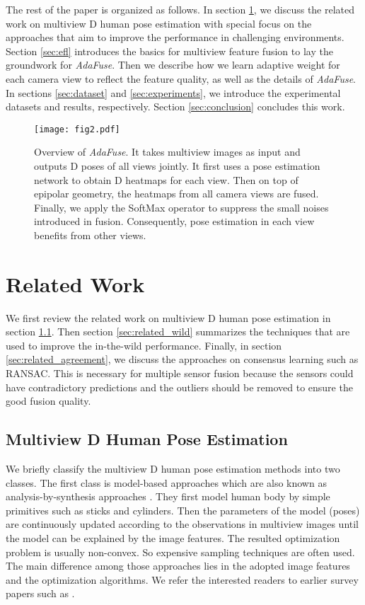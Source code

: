 The rest of the paper is organized as follows. In section \ref{sec:relatedwork}, we discuss the related work on multiview D human pose estimation with special focus on the approaches that aim to improve the performance in challenging environments. Section \ref{sec:efl} introduces the basics for multiview feature fusion to lay the groundwork for \emph{AdaFuse}. Then we describe how we learn adaptive weight for each camera view to reflect the feature quality, as well as the details of \emph{AdaFuse}. In sections \ref{sec:dataset} and \ref{sec:experiments}, we introduce the experimental datasets and results, respectively. Section \ref{sec:conclusion} concludes this work.
\begin{figure*}
    \centering
    \texttt{[image: fig2.pdf]}
    \caption{Overview of \emph{AdaFuse}. It takes multiview images as input and outputs D poses of all views jointly. It first uses a pose estimation network to obtain D heatmaps for each view. Then on top of epipolar geometry, the heatmaps from all camera views are fused. Finally, we apply the SoftMax operator to suppress the small noises introduced in fusion. Consequently, pose estimation in each view benefits from other views.}
    \label{fig:overview}
\end{figure*}

\section{Related Work}
\label{sec:relatedwork}
We first review the related work on multiview D human pose estimation in section \ref{sec:related_general}. Then section \ref{sec:related_wild} summarizes the  techniques that are used to improve the in-the-wild performance. Finally, in section \ref{sec:related_agreement}, we discuss the approaches on consensus learning such as RANSAC. This is necessary for multiple sensor fusion because the sensors could have contradictory predictions and the outliers should be removed to ensure the good fusion quality. 

\subsection{Multiview D Human Pose Estimation}
\label{sec:related_general}
We briefly classify the multiview D human pose estimation methods into two classes. The first class is model-based approaches which are also known as analysis-by-synthesis approaches \citep{liu2011markerless,gall2010optimization,moeslund2006survey,sigal2010humaneva,perez2004data}. They first model human body by simple primitives such as sticks and cylinders. Then the parameters of the model (\ie poses) are continuously updated according to the observations in multiview images until the model can be explained by the image features. The resulted optimization problem is usually non-convex. So expensive sampling techniques are often used. The main difference among those approaches lies in the adopted image features and the optimization algorithms. We refer the interested readers to earlier survey papers such as \citep{moeslund2006survey}.

